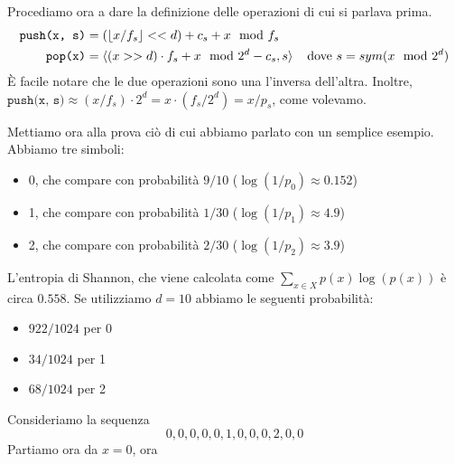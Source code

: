 Procediamo ora a dare la definizione delle operazioni di cui si parlava prima.
\begin{align*}
    \texttt{push(x, s)} &= (\left\lfloor x / f_s \right\rfloor << d) + c_s + x \mod f_s \\
    \texttt{pop(x)} &= \langle (x >> d) \cdot f_s + x \mod 2^d - c_s, s \rangle \hspace{4mm} \textnormal{dove $s = sym(x \mod 2^d)$}
\end{align*}
È facile notare che le due operazioni sono una l'inversa dell'altra. Inoltre, $\texttt{push(x, s)} \approx (x / f_s) \cdot 2^d = x \cdot (f_s / 2^d) = x / p_s$, come volevamo.

Mettiamo ora alla prova ciò di cui abbiamo parlato con un semplice esempio. Abbiamo tre simboli:
\begin{itemize}
    \item 0, che compare con probabilità $9 / 10$ ($\log(1/p_0) \approx 0.152$)
    \item 1, che compare con probabilità $1 / 30$ ($\log(1/p_1) \approx 4.9$)
    \item 2, che compare con probabilità $2 / 30$ ($\log(1/p_2) \approx 3.9$)
\end{itemize}
L'entropia di Shannon, che viene calcolata come $\sum_{x \in X}p(x) \log(p(x))$ è circa $0.558$. Se utilizziamo $d = 10$ abbiamo le seguenti probabilità:
\begin{itemize}
    \item $922 / 1024$ per 0
    \item $34 / 1024$ per 1
    \item $68 / 1024$ per 2
\end{itemize}
Consideriamo la sequenza
\begin{equation*}
    0, 0, 0, 0, 0, 1, 0, 0, 0, 2, 0, 0
\end{equation*}
Partiamo ora da $x = 0$, ora
